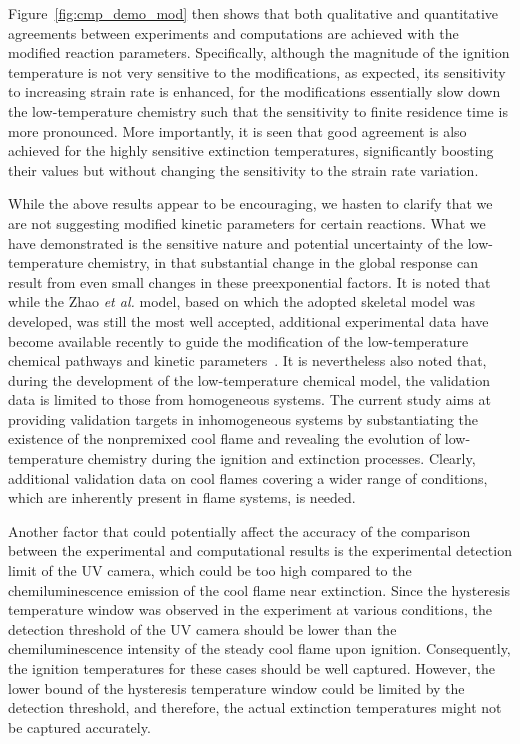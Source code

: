 \documentclass[review,3p,times]{elsarticle}
\begin{document}
Figure~\ref{fig:cmp_demo_mod} then shows that both qualitative and quantitative agreements between experiments and computations are achieved with the modified reaction parameters.  Specifically, although the magnitude of the ignition temperature is not very sensitive to the modifications, as expected, its sensitivity to increasing strain rate is enhanced, for the modifications essentially slow down the low-temperature chemistry such that the sensitivity to finite residence time is more pronounced.  More importantly, it is seen that good agreement is also achieved for the highly sensitive extinction temperatures, significantly boosting their values but without changing the sensitivity to the strain rate variation.

\textcolor{Rev1}{While the above results appear to be encouraging, we hasten to clarify that we are not suggesting modified kinetic parameters for certain reactions. What we have demonstrated is the sensitive nature and potential uncertainty of the low-temperature chemistry, in that substantial change in the global response can result from even small changes in these preexponential factors.}  \textcolor{Rev2}{It is noted that while the Zhao \emph{et al.} model, based on which the adopted skeletal model was developed, was still the most well accepted, additional experimental data have become available recently to guide the modification of the low-temperature chemical pathways and kinetic parameters~\cite{burke15,rodriguez15}.  It is nevertheless also noted that, during the development of the low-temperature chemical model, the validation data is limited to those from homogeneous systems.  The current study aims at providing validation targets in inhomogeneous systems by substantiating the existence of the nonpremixed cool flame and revealing the evolution of low-temperature chemistry during the ignition and extinction processes.  Clearly, additional validation data on cool flames covering a wider range of conditions, which are inherently present in flame systems, is needed.}

Another factor that could potentially affect the accuracy of the comparison between the experimental and computational results is the experimental detection limit of the UV camera, which could be too high compared to the chemiluminescence emission of the cool flame near extinction.  Since the hysteresis temperature window was observed in the experiment at various conditions, the detection threshold of the UV camera should be lower than the chemiluminescence intensity of the steady cool flame upon ignition.  Consequently, the ignition temperatures for these cases should be well captured.  However, the lower bound of the hysteresis temperature window could be limited by the detection threshold, and therefore, the actual extinction temperatures might not be captured accurately.
\end{document}

